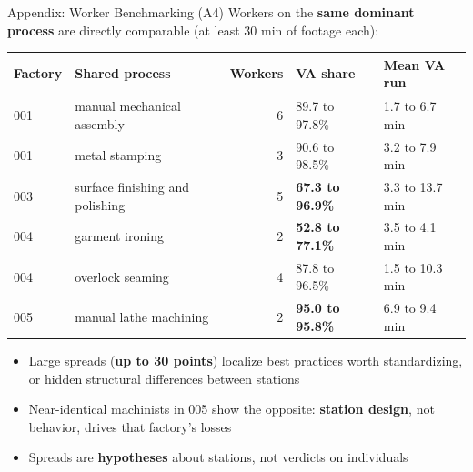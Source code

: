 \documentclass[aspectratio=169]{beamer}
\newcommand{\keyc}[1]{\textbf{\textcolor{egoblue}{#1}}}
\newcommand{\keyg}[1]{\textbf{\textcolor{egogreen!70!black}{#1}}}
\newcommand{\keya}[1]{\textbf{\textcolor{egoamber!85!black}{#1}}}
\begin{document}
\begin{frame}{Appendix: Worker Benchmarking (A4)}
  \small
  Workers on the \keyc{same dominant process} are directly comparable
  (at least 30 min of footage each):
  \vspace{1mm}
  \begin{center}
  \small
  \begin{tabular}{llrll}
    \toprule
    Factory & Shared process & Workers & VA share & Mean VA run \\
    \midrule
    001 & manual mechanical assembly & 6 & 89.7 to 97.8\% & 1.7 to 6.7 min \\
    001 & metal stamping & 3 & 90.6 to 98.5\% & 3.2 to 7.9 min \\
    003 & surface finishing and polishing & 5 & \keya{67.3 to 96.9\%} & 3.3 to 13.7 min \\
    004 & garment ironing & 2 & \keya{52.8 to 77.1\%} & 3.5 to 4.1 min \\
    004 & overlock seaming & 4 & 87.8 to 96.5\% & 1.5 to 10.3 min \\
    005 & manual lathe machining & 2 & \keyg{95.0 to 95.8\%} & 6.9 to 9.4 min \\
    \bottomrule
  \end{tabular}
  \end{center}
  \vspace{1mm}
  \small
  \begin{itemize}\setlength{\itemsep}{3pt}
    \item Large spreads (\keya{up to 30 points}) localize best practices worth
      standardizing, or hidden structural differences between stations
    \item Near-identical machinists in 005 show the opposite:
      \keyg{station design}, not behavior, drives that factory's losses
    \item Spreads are \keya{hypotheses} about stations, not verdicts on individuals
  \end{itemize}
\end{frame}
\end{document}
